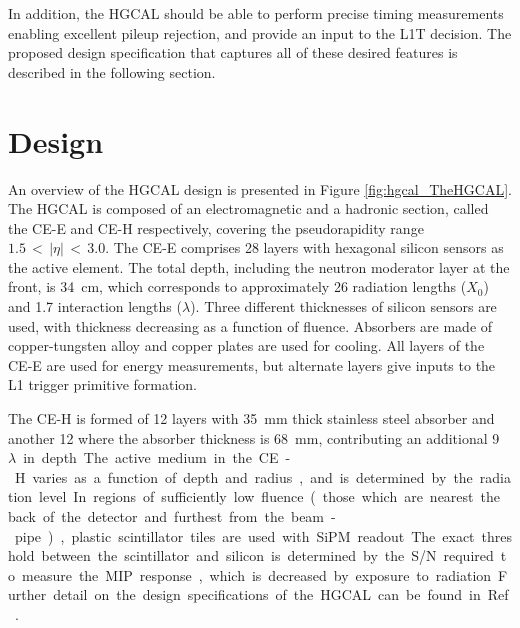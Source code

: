 In addition, the HGCAL should be able to perform precise timing measurements enabling excellent pileup rejection, and provide an input to the L1T decision.
The proposed design specification that captures all of these desired features is described in the following section.

\section{Design}

An overview of the HGCAL design is presented in Figure \ref{fig:hgcal_TheHGCAL}.
The HGCAL is composed of an electromagnetic and a hadronic section, called the CE-E and CE-H respectively, covering the pseudorapidity range $1.5\,<\,|\eta|\,<\,3.0$.
The CE-E comprises 28 layers with hexagonal silicon sensors as the active element.
The total depth, including the neutron moderator layer at the front, is \SI{34}{cm}, which corresponds to approximately 26 radiation lengths ($X_0$) and 1.7 interaction lengths ($\lambda$).
Three different thicknesses of silicon sensors are used, with thickness decreasing as a function of fluence.
Absorbers are made of copper-tungsten alloy and copper plates are used for cooling.
All layers of the CE-E are used for energy measurements, but alternate layers give inputs to the L1 trigger primitive formation. %

The CE-H is formed of 12 layers with \SI{35}{mm} thick stainless steel absorber and another 12 where the absorber thickness is \SI{68}{mm}, contributing an additional \SI{9}{$\lambda$} in depth.
The active medium in the CE-H varies as a function of depth and radius, and is determined by the radiation level.
In regions of sufficiently low fluence (those which are nearest the back of the detector and furthest from the beam-pipe), plastic scintillator tiles are used with SiPM readout.
The exact threshold between the scintillator and silicon is determined by the S/N required to measure the MIP response, which is decreased by exposure to radiation.
Further detail on the design specifications of the HGCAL can be found in Ref.~\cite{HGCAL}.

